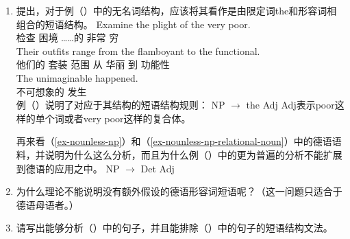 {\begin{enumerate}
请在你的回答中考虑到并列的语料。请假设对称的并列结构要求其并列的短语或词具有相同的句法属性。

\item  \citet{FLGR2012a}提出，对于例（）中的无名词结构，应该将其看作是由限定词the和形容词相组合的短语结构。
\eal
\ex 
\gll Examine the plight of the very poor.\\
检查  困境 ……的  非常 穷\\
\ex 
\gll Their outfits range from the flamboyant to the functional.\\
他们的 套装 范围 从  华丽 到  功能性\\
\ex 
\gll The unimaginable happened.\\
 不可想象的 发生\\
\zl
例（）说明了对应于其结构的短语结构规则：
\ea
NP $\to$ the Adj
\z
Adj表示poor这样的单个词或者very poor这样的复合体。

再来看（\ref{ex-nounless-np}）和（\ref{ex-nounless-np-relational-noun}）中的德语语料，并说明为什么这么分析，而且为什么例（）中的更为普遍的分析不能扩展到德语的应用之中。
\ea
NP $\to$ Det Adj
\z

\item 为什么\xbarc 理论不能说明没有额外假设的德语形容词短语呢？（这一问题只适合于德语母语者。）

\item 请写出能够分析（）中的句子，并且能排除（）中的句子的短语结构文法。


\end{enumerate}}
